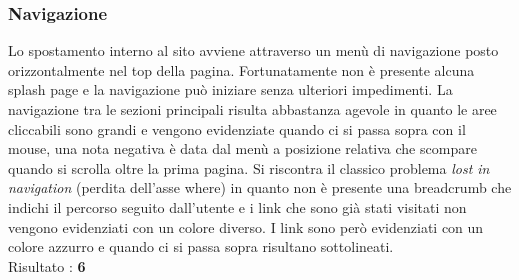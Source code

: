 \subsubsection{Navigazione}
Lo spostamento interno al sito avviene attraverso un menù di navigazione posto
orizzontalmente nel top della pagina. Fortunatamente non è presente alcuna
splash page e la navigazione può iniziare senza ulteriori impedimenti. 
La navigazione tra le sezioni principali
risulta abbastanza agevole in quanto le aree cliccabili sono grandi e vengono 
evidenziate quando ci si passa sopra con il mouse, una nota negativa è data dal 
menù a posizione relativa che scompare quando si scrolla oltre la prima pagina.
Si riscontra il classico problema \textit{lost in navigation} (perdita dell'asse
where) in quanto non è
presente una breadcrumb che indichi il percorso seguito dall'utente e i link che 
sono già stati visitati non vengono evidenziati con un colore diverso. I link 
sono però evidenziati con un colore azzurro e quando ci si passa sopra risultano
sottolineati. \\
Risultato : \textbf{6}